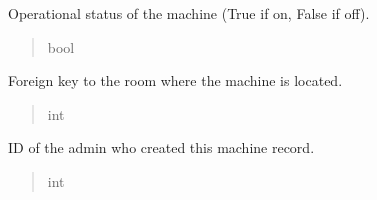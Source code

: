 \documentclass[letterpaper,10pt,english]{sphinxmanual}
\begin{document}
\begin{fulllineitems}
\begin{fulllineitems}
\begin{quote}
\begin{description}
\end{description}\end{quote}

\end{fulllineitems}


\begin{fulllineitems}
\label{\detokenize{app.models:app.models.machine.Machine.on}}
\pysigstartsignatures
\pysigline
{}
\pysigstopsignatures
\sphinxAtStartPar
Operational status of the machine (True if on, False if off).
\begin{quote}\begin{description}
\sphinxAtStartPar
bool

\end{description}\end{quote}

\end{fulllineitems}


\begin{fulllineitems}
\label{\detokenize{app.models:app.models.machine.Machine.idRoom}}
\pysigstartsignatures
\pysigline
{}
\pysigstopsignatures
\sphinxAtStartPar
Foreign key to the room where the machine is located.
\begin{quote}\begin{description}
\sphinxAtStartPar
int

\end{description}\end{quote}

\end{fulllineitems}


\begin{fulllineitems}
\label{\detokenize{app.models:app.models.machine.Machine.createdBy}}
\pysigstartsignatures
\pysigline
{}
\pysigstopsignatures
\sphinxAtStartPar
ID of the admin who created this machine record.
\begin{quote}\begin{description}
\sphinxAtStartPar
int


\end{description}
\end{quote}
\end{fulllineitems}
\end{fulllineitems}
\end{document}
